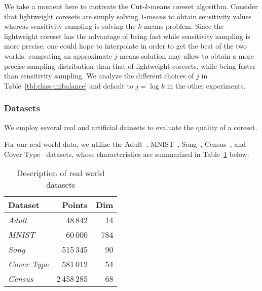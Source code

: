 We take a moment here to motivate the Cut-$k$-means coreset algorithm.  Consider that lightweight coresets are simply solving $1$-means to obtain sensitivity
values whereas sensitivity sampling is solving the $k$-means problem. Since the lightweight coreset has the advantage of being fast while sensitivity sampling
is more precise, one could hope to interpolate in order to get the best of the two worlds: computing an approximate $j$-means solution may allow to obtain
a more precise sampling distribution than that of lightweight-coresets, while being faster than sensitivity sampling. We analyze the different choices of $j$ in
Table~\ref{tbl:class-imbalance} and default to $j = \log k$ in the other experiments.

\subsubsection{Datasets}


We employ several real and artificial datasets to evaluate the quality of a coreset. 

For our real-world data, we utilize the Adult~\cite{Dua:2019}, MNIST~\cite{mnist}, Song~\cite{song}, Census~\cite{census}, and Cover Type~\cite{covtype}
datasets, whose characteristics are summarized in Table~\cref{tbl:datasets} below.

\begin{table}[htbp]
    \label{tbl:datasets}
    \centering
    \begin{tabular}{lrr}
        Dataset & Points & Dim \\
        \hline
        \emph{Adult} & 48\,842 & 14 \\
        \emph{MNIST} & 60\,000 & 784 \\
        \emph{Song} & 515\,345 & 90 \\
        \emph{Cover Type} & 581\,012 & 54 \\
        \emph{Census} & 2\,458\,285 & 68
    \end{tabular}
    \caption{Description of real world datasets}
\end{table}

